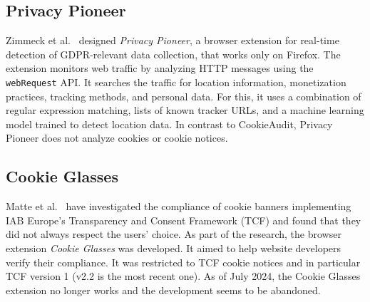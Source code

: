 \subsection{Privacy Pioneer}
Zimmeck et al.~\cite{zimmeck2024pioneer} designed \emph{Privacy Pioneer}, a browser extension for real-time detection of GDPR-relevant data collection, that works only on Firefox.
The extension monitors web traffic by analyzing HTTP messages using the \verb|webRequest| API.
It searches the traffic for location information, monetization practices, tracking methods, and personal data. 
For this, it uses a combination of regular expression matching, lists of known tracker URLs, and a machine learning model trained to detect location data.
In contrast to CookieAudit, Privacy Pioneer does not analyze cookies or cookie notices.

\subsection{Cookie Glasses}
Matte et al.~\cite{matte2020cookiebannersrespectchoice} have investigated the compliance of cookie banners implementing IAB Europe’s Transparency and Consent Framework (TCF) and found that they did not always respect the users' choice.
As part of the research, the browser extension \emph{Cookie Glasses} was developed.
It aimed to help website developers verify their compliance.
It was restricted to TCF cookie notices and in particular TCF version 1 (v2.2 is the most recent one).
As of July 2024, the Cookie Glasses extension no longer works and the development seems to be abandoned.
